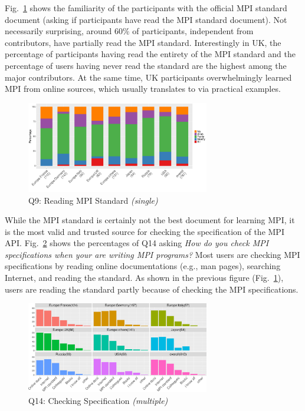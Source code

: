 \documentclass[preprint,5p,times]{elsarticle}
\def\myquote#1{{\it #1}}
\newcommand{\revision}[2]{{\color{blue}#2}}
\def\countries{contributors\xspace{}}%
\def\mcountries{major contributors\xspace{}}%
\begin{document}
Fig.~\ref{fig:reading-standard} shows the familiarity of the participants with
the official MPI standard document (asking if participants have read the MPI
standard document). Not necessarily surprising, around 60\% of participants,
independent from \countries, have partially read the MPI standard. Interestingly
in UK, \revision{the percentage of participants having read the entirety of the MPI
standard is similar to the percentage of users having never read the
standard.}
{the percentage of participants having read the entirety of the MPI
standard and the percentage of users having never read the
standard are the highest among the \mcountries.}
\revision{In}{At the} same time, UK participants overwhelmingly learned MPI from online sources,
which usually \revision{translate by}{translates to} via practical examples.

\begin{figure}[tb]
\begin{center}
\includegraphics[width=8.0cm]{R-scripts/Q9.pdf}
\caption{Q9: Reading MPI Standard {\it(single)}}
\label{fig:reading-standard}
\vspace{-3mm}%
\end{center}
\end{figure}

While the MPI standard is certainly not the best document for learning MPI, it
is the most valid and trusted source for checking the specification of the MPI
API. Fig.~\ref{fig:checking-spec} shows the percentages of Q14 asking
\myquote{How do you check MPI specifications when your are writing MPI
programs?} Most users are checking MPI specifications by reading online
documentations (e.g., man pages), searching Internet, and reading the standard.
As shown in the previous figure (Fig.~\ref{fig:reading-standard}), users are
reading the standard partly because of checking the MPI specifications.

\begin{figure}[tb]
\begin{center}
\includegraphics[width=8.0cm]{R-scripts/Q14.pdf}
\caption{Q14: Checking Specification {\it(multiple)}}
\label{fig:checking-spec}
\vspace{-3mm}%
\end{center}
\end{figure}
\end{document}
